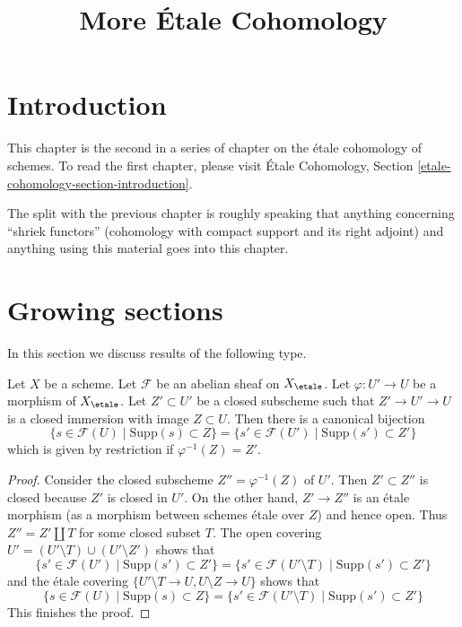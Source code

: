 

%


\title{More \'Etale Cohomology}


\maketitle

\label{section-phantom}

\tableofcontents


\section{Introduction}
\label{section-introduction}

\noindent
This chapter is the second in a series of chapter on the \'etale cohomology
of schemes. To read the first chapter, please visit
\'Etale Cohomology, Section \ref{etale-cohomology-section-introduction}.

\medskip\noindent
The split with the previous chapter is roughly speaking that anything
concerning ``shriek functors'' (cohomology with compact support and
its right adjoint) and anything using this material goes into this chapter.






\section{Growing sections}
\label{section-growing}

\noindent
In this section we discuss results of the following type.

\begin{lemma}
\label{lemma-section-support-in-locally-closed-pre}
Let $X$ be a scheme. Let $\mathcal{F}$ be an abelian sheaf on $X_\etale$.
Let $\varphi : U' \to U$ be a morphism of $X_\etale$. Let $Z' \subset U'$ be a
closed subscheme such that $Z' \to U' \to U$ is a closed immersion
with image $Z \subset U$. Then there is a canonical bijection
$$
\{s \in \mathcal{F}(U) \mid \text{Supp}(s) \subset Z\} =
\{s' \in \mathcal{F}(U') \mid \text{Supp}(s') \subset Z'\}
$$
which is given by restriction if $\varphi^{-1}(Z) = Z'$.
\end{lemma}

\begin{proof}
Consider the closed subscheme $Z'' = \varphi^{-1}(Z)$ of $U'$.
Then $Z' \subset Z''$ is closed because $Z'$ is closed in $U'$.
On the other hand, $Z' \to Z''$ is an \'etale morphism
(as a morphism between schemes \'etale over $Z$) and hence
open. Thus $Z'' = Z' \amalg T$ for some closed subset $T$.
The open covering $U' = (U' \setminus T) \cup (U' \setminus Z')$
shows that
$$
\{s' \in \mathcal{F}(U') \mid \text{Supp}(s') \subset Z'\} =
\{s' \in \mathcal{F}(U' \setminus T) \mid \text{Supp}(s') \subset Z'\}
$$
and the \'etale covering $\{U' \setminus T \to U, U \setminus Z \to U\}$
shows that
$$
\{s \in \mathcal{F}(U) \mid \text{Supp}(s) \subset Z\} =
\{s' \in \mathcal{F}(U' \setminus T) \mid \text{Supp}(s') \subset Z'\}
$$
This finishes the proof.
\end{proof}

